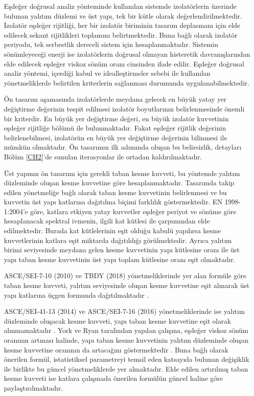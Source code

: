 \label{EquivalentLinearAnalysis} Eşdeğer doğrusal analiz yönteminde
kullanılan sistemde izolatörlerin üzerinde bulunan yalıtım düzlemi
ve üst yapı, tek bir kütle olarak değerlendirilmektedir. İzolatör
eşdeğer rijitliği, her bir izolatör biriminin tasarım deplasmanı için
elde edilecek sekant rijitlikleri toplamını belirtmektedir. Buna bağlı
olarak izolatör periyodu, tek serbestlik dereceli sistem için hesaplanmaktadır.
Sistemin sönümleyeceği enerji ise izolatörlerin doğrusal olmayan histeretik
davranışlarından elde edilecek eşdeğer viskoz sönüm oranı cinsinden
ifade edilir. Eşdeğer doğrusal analiz yöntemi, içerdiği kabul ve idealleştirmeler
sebebi ile kullanılan yönetmeliklerde belirtilen kriterlerin sağlanması
durumunda uygulanabilmektedir.

Ön tasarım aşamasında izolatörlerde meydana gelecek en büyük yatay
yer değiştirme değerinin tespit edilmesi izolatör boyutlarının belirlenmesinde
önemli bir kriterdir. En büyük yer değiştirme değeri, en büyük izolatör
kuvvetinin eşdeğer rijitliğe bölümü ile bulunmaktadır. Fakat eşdeğer
rijitlik değerinin belirlenebilmesi, izolatörün en büyük yer değiştirme
değerinin bilinmesi ile mümkün olmaktadır. Ön tasarımın ilk adımında
oluşan bu belirsizlik, detayları Bölüm \ref{CH2}'de sunulan iterasyonlar
ile ortadan kaldırılmaktadır.

Üst yapının ön tasarımı için gerekli taban kesme kuvveti, bu yöntemde
yalıtım düzleminde oluşan kesme kuvvetine göre hesaplanmaktadır. Tasarımda
takip edilen yönetmeliğe bağlı olarak taban kesme kuvvetinin belirlenmesi
ve bu kuvvetin üst yapı katlarına dağıtılma biçimi farklılık göstermektedir.
EN 1998-1:2004'e göre, katlara etkiyen yatay kuvvetler eşdeğer periyot
ve sönüme göre hesaplanacak spektral ivmenin, ilgili kat kütlesi ile
çarpımından elde edilmektedir\cite{Eurocode2004}. Burada kat kütlelerinin
eşit olduğu kabulü yapılırsa kesme kuvvetlerinin katlara eşit miktarda
dağıtıldığı görülmektedir. Ayrıca yalıtım birimi seviyesinde meydana
gelen kesme kuvvetinin yapı kütlesine oranı ile üst yapı taban kesme
kuvvetinin üst yapı toplam kütlesine oranı eşit olmaktadır.

ASCE/SEI-7-10 (2010) ve TBDY (2018) yönetmeliklerinde yer alan formüle
göre taban kesme kuvveti, yalıtım seviyesinde oluşan kesme kuvvetine
eşit alınarak üst yapı katlarına üçgen formunda dağıtılmaktadır \cite{ASCE2010,TBDY2018}.

ASCE/SEI-41-13 (2014) ve ASCE/SEI-7-16 (2016) yönetmeliklerinde ise
yalıtım düzleminde oluşacak kesme kuvveti, yapı taban kesme kuvvetine
eşit olarak alınmamaktadır \cite{ASCE41-13,ASCE2016}. York ve Ryan
tarafından yapılan çalışma, eşdeğer viskoz sönüm oranının artması
halinde, yapı taban kesme kuvvetinin yalıtım düzleminde oluşan kesme
kuvvetine oranının da artacağını göstermektedir \cite{doi:10.1080/13632460802003751}.
Buna bağlı olarak önerilen formül, istatistiksel parametreyi temsil
eden katsayıda bulunan değişiklik ile birlikte bu güncel yönetmeliklerde
yer almaktadır. Elde edilen artırılmış taban kesme kuvveti ise katlara
çalışmada önerilen formülün güncel haline göre paylaştırılmaktadır.

